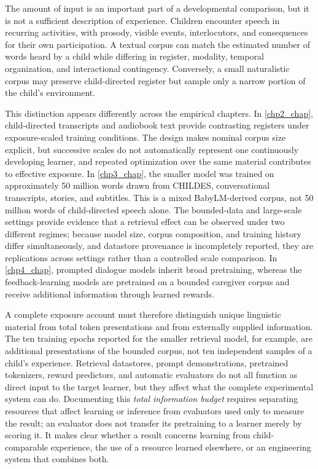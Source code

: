 The amount of input is an important part of a developmental comparison, but it is not a sufficient description of experience. Children encounter speech in recurring activities, with prosody, visible events, interlocutors, and consequences for their own participation. A textual corpus can match the estimated number of words heard by a child while differing in register, modality, temporal organization, and interactional contingency. Conversely, a small naturalistic corpus may preserve child-directed register but sample only a narrow portion of the child's environment.

This distinction appears differently across the empirical chapters. In \cref{chp2_chap}, child-directed transcripts and audiobook text provide contrasting registers under exposure-scaled training conditions. The design makes nominal corpus size explicit, but successive scales do not automatically represent one continuously developing learner, and repeated optimization over the same material contributes to effective exposure. In \cref{chp3_chap}, the smaller model was trained on approximately 50 million words drawn from CHILDES, conversational transcripts, stories, and subtitles. This is a mixed BabyLM-derived corpus, not 50 million words of child-directed speech alone. The bounded-data and large-scale settings provide evidence that a retrieval effect can be observed under two different regimes; because model size, corpus composition, and training history differ simultaneously, and datastore provenance is incompletely reported, they are replications across settings rather than a controlled scale comparison. In \cref{chp4_chap}, prompted dialogue models inherit broad pretraining, whereas the feedback-learning models are pretrained on a bounded caregiver corpus and receive additional information through learned rewards.

A complete exposure account must therefore distinguish unique linguistic material from total token presentations and from externally supplied information. The ten training epochs reported for the smaller retrieval model, for example, are additional presentations of the bounded corpus, not ten independent samples of a child's experience. Retrieval datastores, prompt demonstrations, pretrained tokenizers, reward predictors, and automatic evaluators do not all function as direct input to the target learner, but they affect what the complete experimental system can do. Documenting this \emph{total information budget} requires separating resources that affect learning or inference from evaluators used only to measure the result; an evaluator does not transfer its pretraining to a learner merely by scoring it. It makes clear whether a result concerns learning from child-comparable experience, the use of a resource learned elsewhere, or an engineering system that combines both.

